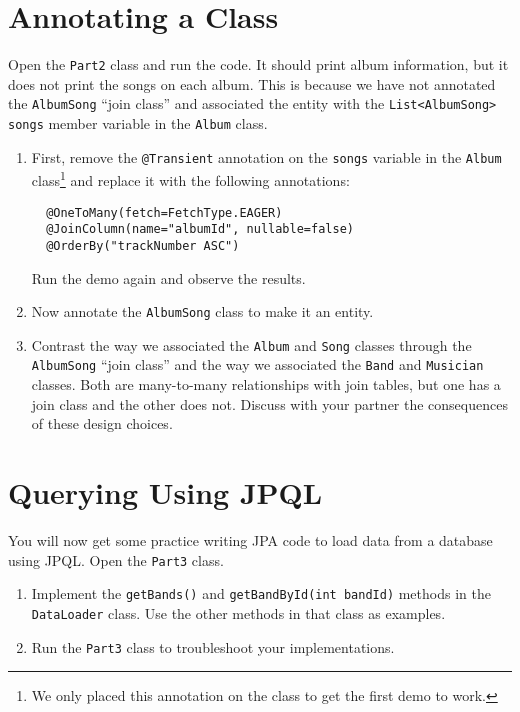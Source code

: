 \documentclass[12pt]{scrartcl}
\begin{document}
\section*{Annotating a Class}

Open the \texttt{Part2} class and run the code.  It should print
album information, but it does not print the songs on each album.  This is
because we have not annotated the \texttt{AlbumSong} ``join class''
and associated the entity with the \texttt{List<AlbumSong> songs}
member variable in the \texttt{Album} class.

\begin{enumerate}
  \item First, remove the \texttt{@Transient} annotation on the
  \texttt{songs} variable in the \texttt{Album} class\footnote{We
  only placed this annotation on the class to get the first demo to work.} and
  replace it with the following annotations:

  \begin{verbatim}
  @OneToMany(fetch=FetchType.EAGER)
  @JoinColumn(name="albumId", nullable=false)
  @OrderBy("trackNumber ASC")
  \end{verbatim}
  
  Run the demo again and observe the results.
  \item Now annotate the \texttt{AlbumSong} class to make it an 
  entity.  
  \item Contrast the way we associated the \texttt{Album} and 
  \texttt{Song} classes through the \texttt{AlbumSong}
  ``join class'' and the way we associated the \texttt{Band} and
  \texttt{Musician} classes.  Both are many-to-many
  relationships with join tables, but one has a join class and the other
  does not.  Discuss with your partner the consequences of these design choices.  
\end{enumerate}

\section*{Querying Using JPQL}

You will now get some practice writing JPA code to load data from a database
using JPQL.  Open the \texttt{Part3} class.  
\begin{enumerate}
  \item Implement the \texttt{getBands()} and 
    \texttt{getBandById(int bandId)} methods in the \texttt{DataLoader}
    class.  Use the other methods in that class as examples.
  \item Run the \texttt{Part3} class to troubleshoot your implementations.
\end{enumerate}
\end{document}
